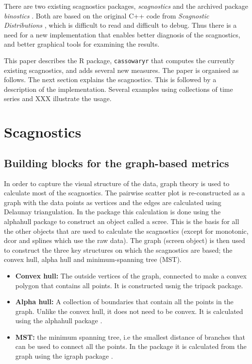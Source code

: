 There are two existing scagnostics packages, \emph{scagnostics}
\citep{scagdist} and the archived package \emph{binostics}
\citep{binostics}. Both are based on the original C++ code from
\emph{Scagnostic Distributions} \citep{something}, which is difficult to
read and difficult to debug. Thus there is a need for a new
implementation that enables better diagnosis of the scagnostics, and
better graphical tools for examining the results.

This paper describes the R package, \texttt{cassowaryr} that computes
the currently existing scagnostics, and adds several new measures. The
paper is organised as follows. The next section explains the
scagnostics. This is followed by a description of the implementation.
Several examples using collections of time series and XXX illustrate the
usage.

\hypertarget{scagnostics}{%
\section{Scagnostics}\label{scagnostics}}

\hypertarget{building-blocks-for-the-graph-based-metrics}{%
\subsection{Building blocks for the graph-based
metrics}\label{building-blocks-for-the-graph-based-metrics}}

In order to capture the visual structure of the data, graph theory is
used to calculate most of the scagnostics. The pairwise scatter plot is
re-constructed as a graph with the data points as vertices and the edges
are calculated using Delaunay triangulation. In the package this
calculation is done using the alphahull package \citep{alphahull} to
construct an object called a scree. This is the basis for all the other
objects that are used to calculate the scagnostics (except for
monotonic, dcor and splines which use the raw data). The graph (screen
object) is then used to construct the three key structures on which the
scagnostics are based; the convex hull, alpha hull and minimum-spanning
tree (MST).

\begin{itemize}
\item
  \textbf{Convex hull:} The outside vertices of the graph, connected to
  make a convex polygon that contains all points. It is constructed
  usnig the tripack package.
\item
  \textbf{Alpha hull:} A collection of boundaries that contain all the
  points in the graph. Unlike the convex hull, it does not need to be
  convex. It is calculated using the alphahull package
  \citep{alphahull}.
\item
  \textbf{MST:} the minimum spanning tree, i.e the smallest distance of
  branches that can be used to connect all the points. In the package it
  is calculated from the graph using the igraph package \citep{igraph}.
\end{itemize}

